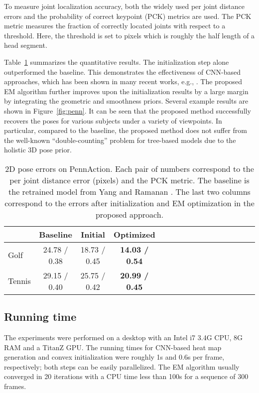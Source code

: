 \documentclass[10pt,twocolumn,letterpaper]{article}
\newcommand{\refFig}[1]{Figure~\ref{#1}}
\newcommand{\refTab}[1]{Table~\ref{#1}}
\begin{document}
{To measure joint localization accuracy, both the widely used per joint distance errors and the probability of correct keypoint (PCK) metrics are used.
The PCK metric measures the fraction of correctly located joints with respect to a threshold. Here, the threshold is set to  pixels which is roughly the half length of a head segment.

 \refTab{tab:penn} summarizes the quantitative results.
The initialization step alone outperformed the baseline. This demonstrates the effectiveness of CNN-based approaches, which has been shown in many recent works, e.g., \cite{toshev2014deep,pfister2015flowing}. The proposed EM algorithm further improves upon the initialization results by a large margin by integrating the geometric and smoothness priors.
Several example results are shown in \refFig{fig:penn}. It can be seen that the proposed method successfully recovers the poses for various subjects under a variety of viewpoints. In particular, compared to the baseline, the proposed method does not suffer from the well-known ``double-counting'' problem for tree-based models \cite{yang2011articulated} due to the holistic 3D pose prior.

\begin{table}
\centering
\renewcommand{\arraystretch}{1.2}
\begin{tabular}{l*{15}{c}}
\toprule
 & Baseline & Initial & Optimized \\
\toprule
Golf & 24.78 / 0.38 & 18.73 / 0.45 & \textbf{14.03 / 0.54} \\
Tennis & 29.15 / 0.40 & 25.75 / 0.42 & \textbf{20.99 / 0.45} \\
\toprule
\end{tabular}
\vspace{0.25em}
\caption{2D pose errors on PennAction. Each pair of numbers correspond to the per joint distance error (pixels) and the PCK metric. The baseline is the retrained model from Yang and  Ramanan \cite{yang2011articulated}. The last two columns correspond to the errors after initialization and EM optimization in the proposed approach.}\label{tab:penn}
\vspace{-1em}
\end{table}

\subsection{Running time}

The experiments were performed on a desktop with an Intel i7 3.4G CPU, 8G RAM and a TitanZ GPU.
The running times for CNN-based heat map generation and convex initialization were roughly 1s and 0.6s per frame, respectively; both steps can be easily parallelized. The EM algorithm usually converged in 20 iterations with a CPU time less than 100s for a sequence of 300 frames.
 
}
\end{document}

